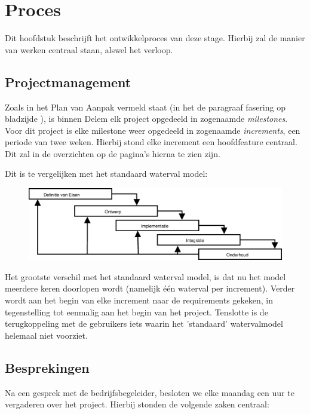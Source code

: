 \chapter{Proces}
\label{proces}

Dit hoofdstuk beschrijft het ontwikkelproces van deze stage. Hierbij zal de manier van werken centraal staan, alswel het verloop.

\section{Projectmanagement}

Zoals in het Plan van Aanpak vermeld staat (in het de paragraaf fasering op bladzijde \pageref{fasering}), is binnen Delem elk project opgedeeld in zogenaamde \emph{milestones}. Voor dit project is elke milestone weer opgedeeld in zogenaamde \emph{increments}, een periode van twee weken. Hierbij stond elke increment een hoofdfeature centraal. Dit zal in de overzichten op de pagina's hierna te zien zijn.

Dit is te vergelijken met het standaard waterval model:

\begin{figure}[h]
\includegraphics[width=\textwidth]{waterval}
\end{figure}

Het grootste verschil met het standaard waterval model, is dat nu het model meerdere keren doorlopen wordt (namelijk \'e\'en waterval per increment). Verder wordt aan het begin van elke increment naar de requirements gekeken, in tegenstelling tot eenmalig aan het begin van het project. Tenslotte is de terugkoppeling met de gebruikers iets waarin het 'standaard' watervalmodel helemaal niet voorziet.

\section{Besprekingen}

Na een gesprek met de bedrijfsbegeleider, besloten we elke maandag een uur te vergaderen over het project. Hierbij stonden de volgende zaken centraal:


